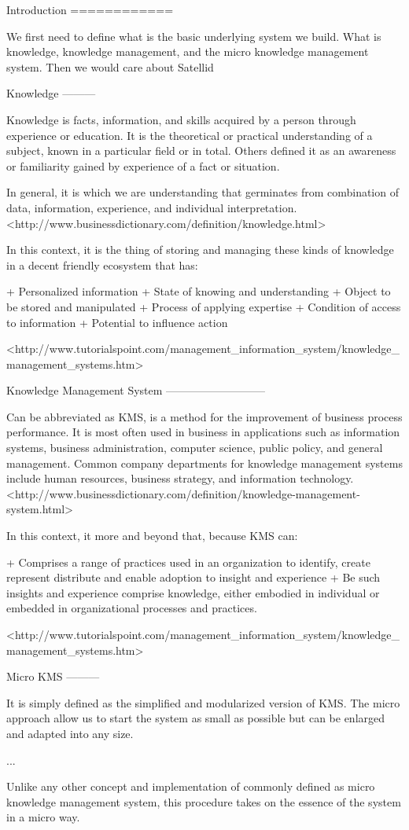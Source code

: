 Introduction
============

We first need to define what is the basic underlying system we build.
What is knowledge, knowledge management, and the micro knowledge management system.
Then we would care about Satellid

Knowledge
---------

Knowledge is facts, information, and skills acquired by a person through experience or education.
It is the theoretical or practical understanding of a subject, known in a particular field or in total.
Others defined it as an awareness or familiarity gained by experience of a fact or situation.

In general, it is which we are understanding that germinates from combination of data, information, experience, and individual interpretation. <http://www.businessdictionary.com/definition/knowledge.html>

In this context, it is the thing of storing and managing these kinds of knowledge in a decent friendly ecosystem that has:

+ Personalized information
+ State of knowing and understanding
+ Object to be stored and manipulated
+ Process of applying expertise
+ Condition of access to information
+ Potential to influence action

<http://www.tutorialspoint.com/management_information_system/knowledge_management_systems.htm>

Knowledge Management System
---------------------------

Can be abbreviated as KMS, is a method for the improvement of business process performance. It is most often used in business in applications such as information systems, business administration, computer science, public policy, and general management. Common company departments for knowledge management systems include human resources, business strategy, and information technology.
<http://www.businessdictionary.com/definition/knowledge-management-system.html>

In this context, it more and beyond that, because KMS can:

+ Comprises a range of practices used in an organization to identify, create represent distribute and enable adoption to insight and experience
+ Be such insights and experience comprise knowledge, either embodied in individual or embedded in organizational processes and practices.

<http://www.tutorialspoint.com/management_information_system/knowledge_management_systems.htm>

Micro KMS
---------

It is simply defined as the simplified and modularized version of KMS.
The micro approach allow us to start the system as small as possible but can be enlarged and adapted into any size.

...

Unlike any other concept and implementation of commonly defined as micro knowledge management system, this procedure takes on the essence of the system in a micro way.

